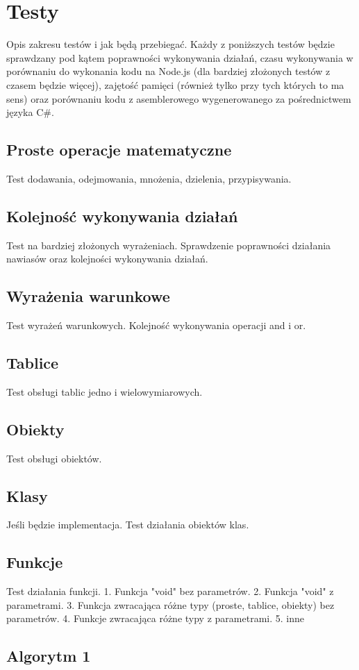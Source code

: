 \chapter{Testy}
\label{rozdzial4}
Opis zakresu testów i jak będą przebiegać.
Każdy z poniższych testów będzie sprawdzany pod kątem poprawności wykonywania działań, czasu wykonywania w porównaniu do wykonania kodu na Node.js (dla bardziej złożonych testów z czasem będzie więcej), zajętość pamięci (również tylko przy tych których to ma sens) oraz porównaniu kodu z asemblerowego wygenerowanego za pośrednictwem języka C\#.

\section{Proste operacje matematyczne}
Test dodawania, odejmowania, mnożenia, dzielenia, przypisywania.
\section{Kolejność wykonywania działań}
Test na bardziej złożonych wyrażeniach. Sprawdzenie poprawności działania nawiasów oraz kolejności wykonywania działań.
\section{Wyrażenia warunkowe}
Test wyrażeń warunkowych. Kolejność wykonywania operacji and i or.
\section{Tablice}
Test obsługi tablic jedno i wielowymiarowych.
\section{Obiekty}
Test obsługi obiektów.
\section{Klasy}
Jeśli będzie implementacja.
Test działania obiektów klas.
\section{Funkcje}
Test działania funkcji.
1. Funkcja "void" bez parametrów.
2. Funkcja "void" z parametrami.
3. Funkcja zwracająca różne typy (proste, tablice, obiekty) bez parametrów.
4. Funkcje zwracająca różne typy z parametrami.
5. inne

\section{Algorytm 1}
